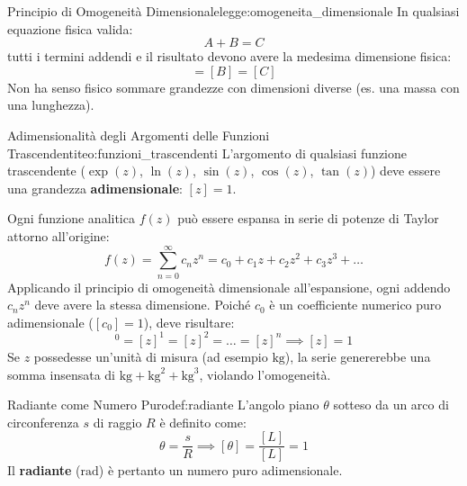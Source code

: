 \begin{legge}{Principio di Omogeneità Dimensionale}{legge:omogeneita_dimensionale}
In qualsiasi equazione fisica valida:
\begin{equation}
    A + B = C
\end{equation}
tutti i termini addendi e il risultato devono avere la medesima dimensione fisica:
\begin{equation}
    [A] = [B] = [C]
\end{equation}
Non ha senso fisico sommare grandezze con dimensioni diverse (es. una massa con una lunghezza).
\end{legge}

\begin{teorema}{Adimensionalità degli Argomenti delle Funzioni Trascendenti}{teo:funzioni_trascendenti}
L'argomento di qualsiasi funzione trascendente ($\exp(z)$, $\ln(z)$, $\sin(z)$, $\cos(z)$, $\tan(z)$) deve essere una grandezza \textbf{adimensionale}: $[z] = 1$.
\end{teorema}

\begin{dimostrazione}
Ogni funzione analitica $f(z)$ può essere espansa in serie di potenze di Taylor attorno all'origine:
\begin{equation}
    f(z) = \sum_{n=0}^{\infty} c_n z^n = c_0 + c_1 z + c_2 z^2 + c_3 z^3 + \dots
\end{equation}
Applicando il principio di omogeneità dimensionale all'espansione, ogni addendo $c_n z^n$ deve avere la stessa dimensione. Poiché $c_0$ è un coefficiente numerico puro adimensionale ($[c_0]=1$), deve risultare:
\begin{equation}
    [z]^0 = [z]^1 = [z]^2 = \dots = [z]^n \implies [z] = 1
\end{equation}
Se $z$ possedesse un'unità di misura (ad esempio $\si{\kilogram}$), la serie genererebbe una somma insensata di $\si{\kilogram} + \si{\kilogram}^2 + \si{\kilogram}^3$, violando l'omogeneità.
\end{dimostrazione}

\begin{definizione}{Radiante come Numero Puro}{def:radiante}
L'angolo piano $\theta$ sotteso da un arco di circonferenza $s$ di raggio $R$ è definito come:
\begin{equation}
    \theta = \frac{s}{R} \implies [\theta] = \frac{[L]}{[L]} = 1
\end{equation}
Il \textbf{radiante} ($\si{\radian}$) è pertanto un numero puro adimensionale.
\end{definizione}


